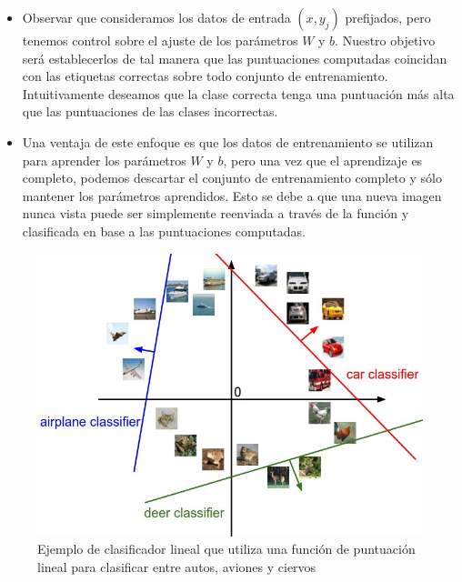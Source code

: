 \documentclass[a4paper,11pt,spanish]{book}
\begin{document}
	  \begin{itemize}
	   \item Observar que consideramos los datos de entrada $(x, y_{j})$  prefijados, pero tenemos control sobre el ajuste de los parámetros $W$ y $b$.
		 Nuestro objetivo será establecerlos de tal manera que las puntuaciones computadas coincidan con las etiquetas correctas sobre todo conjunto de entrenamiento.
		 Intuitivamente deseamos que la clase correcta tenga una puntuación más alta que las puntuaciones de las clases incorrectas.
	   \item Una ventaja de este enfoque es que los datos de entrenamiento se utilizan para aprender los parámetros $W$ y $b$, pero una vez que el aprendizaje es completo,
		podemos descartar el conjunto de entrenamiento completo y sólo mantener los parámetros aprendidos. Esto se debe a que una nueva imagen nunca vista puede ser
		simplemente reenviada a través de la función y clasificada en base a las puntuaciones computadas.
	  \end{itemize}
	  \begin{figure}[h!]
	    \begin{center}
	     \includegraphics[scale=0.5]{./img/stanford_linear_class.jpeg}
	    \end{center}
	    \caption{Ejemplo de clasificador lineal que utiliza una función de puntuación lineal para clasificar entre autos, aviones y ciervos}
	    \label{fig:linear_classifier}
	  \end{figure}
\end{document}
